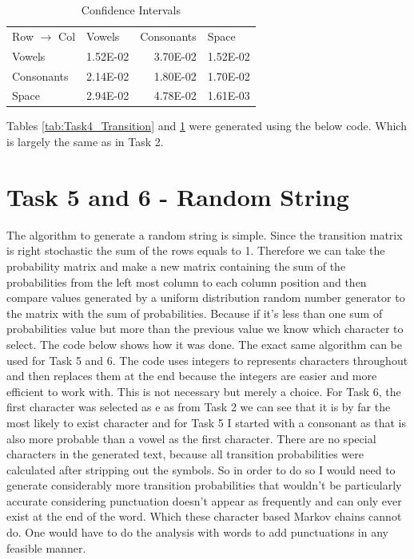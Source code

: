 \documentclass[11pt,a4paper]{CLabBookTemplate} %
\begin{document}
\begin{table}[htbp]
	\centering
	\caption{Confidence Intervals}
	\begin{tabular}{lrrr}
		Row $\rightarrow$ Col & \multicolumn{1}{l}{Vowels} & \multicolumn{1}{l}{Consonants} & \multicolumn{1}{l}{Space} \\
		Vowels     & 1.52E-02 & 3.70E-02 & 1.52E-02 \\
		Consonants     & 2.14E-02 & 1.80E-02 & 1.70E-02 \\
		Space & 2.94E-02 & 4.78E-02 & 1.61E-03 \\
	\end{tabular}%
	\label{tab:Task4_CI}%
\end{table}%
Tables \ref{tab:Task4_Transition} and \ref{tab:Task4_CI} were generated using the below code. Which is largely the same as in Task 2.\\

 
 
\section{Task 5 and 6 - Random String}

The algorithm to generate a random string is simple. Since the transition matrix is right stochastic the sum of the rows equals to 1. Therefore we can take the probability matrix and make a new matrix containing the sum of the probabilities from the left most column to each column position and then compare values generated by a uniform distribution random number generator to the matrix with the sum of probabilities. Because if it's less than one sum of probabilities value but more than the previous value we know which character to select. The code below shows how it was done. The exact same algorithm can be used for Task 5 and 6. The code uses integers to represents characters throughout and then replaces them at the end because the integers are easier and more efficient to work with. This is not necessary but merely a choice. For Task 6, the first character was selected as e as from Task 2 we can see that it is by far the most likely to exist character and for Task 5 I started with a consonant as that is also more probable than a vowel as the first character. There are no special characters in the generated text, because all transition probabilities were calculated after stripping out the symbols. So in order to do so I would need to generate considerably more transition probabilities that wouldn't be particularly accurate considering punctuation doesn't appear as frequently and can only ever exist at the end of the word. Which these character based Markov chains cannot do. One would have to do the analysis with words to add punctuations in any feasible manner. 
\end{document}
